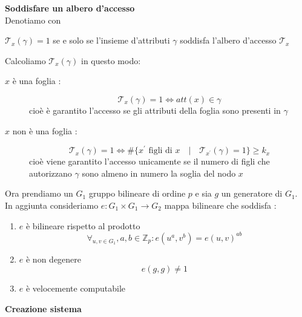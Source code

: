 \vspace{0.2cm}
\textbf{Soddisfare un albero d'accesso}\\
Denotiamo con 
\begin{center}
$\mathcal{T}_x(\gamma) = 1$ se e solo se l'insieme d'attributi $\gamma$ soddisfa l'albero d'accesso $\mathcal{T}_x$
\end{center}
Calcoliamo $\mathcal{T}_x(\gamma)$ in questo modo:
\begin{description}
\item[$x$ è una foglia :] \[\mathcal{T}_x(\gamma) = 1 \Leftrightarrow att(x) \in \gamma\]
cioè è garantito l'accesso se gli attributi della foglia sono presenti in $\gamma$
\item[$x$ non è una foglia :] \[\mathcal{T}_x(\gamma) = 1  \Leftrightarrow \# \{x^\prime \text{ figli di } x \quad|\quad \mathcal{T}_{x^\prime}(\gamma) = 1  \} \geq k_x\]
cioè viene garantito l'accesso unicamente se il numero di figli che autorizzano $\gamma$ sono almeno in numero la soglia del nodo $x$ 
\end{description}

\vspace{0.8cm}

Ora prendiamo un $G_1$ gruppo bilineare di ordine $p$ e sia $g$ un generatore di $G_1$.\\
In aggiunta consideriamo $e : G_1 \times G_1 \rightarrow G_2$ mappa bilineare che soddisfa :\label{pairinge}
\begin{enumerate}
\item $e$ è bilineare rispetto al prodotto
\[ \forall_{u,v \in G_1}, a,b \in \mathbb{Z}_p : e(u^a,v^b) = e(u,v)^{ab} \]
\item $e$ è non degenere \[e(g,g) \neq 1\]
\item $e$ è velocemente computabile
\end{enumerate}


\vspace{0.8cm}

\textbf{Creazione sistema}

